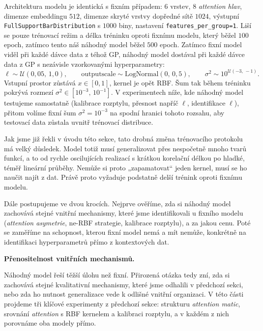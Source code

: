 Architektura modelu je identická s fixním případem: $6$ vrstev, $8$ \emph{attention hlav}, dimenze embeddingu $512$, dimenze skryté vrstvy dopředné sítě $1024$, výstupní \texttt{FullSupportBarDistribution} s $1000$ biny, nastavení \lstinline|features_per_group=1|.
Liší se pouze trénovací režim a délka tréninku oproti fixnímu modelu, který běžel $100$ epoch, zatímco tento náš náhodný model běžel $500$ epoch.
Zatímco fixní model viděl při každé dávce data z téhož GP, náhodný model dostával při každé dávce data z GP s nezávisle vzorkovanými hyperparametry:
$$\ell \sim \mathcal{U}(0{,}05,\, 1{,}0), \qquad \text{outputscale} \sim \text{LogNormal}(0,\, 0{,}5), \qquad \sigma^2 \sim 10^{\mathcal{U}(-3,\,-1)}.$$
Vstupní prostor zůstává $x \in [0, 1]$, kernel je opět RBF.
Šum tak během tréninku pokrývá rozmezí $\sigma^2 \in [10^{-3},\, 10^{-1}]$.
V experimentech níže, kde náhodný model testujeme samostatně (kalibrace rozptylu, přesnost napříč $\ell$, identifikace $\ell$), přitom volíme fixní šum $\sigma^2 = 10^{-3}$ na spodní hranici tohoto rozsahu, aby testovací data zůstala uvnitř trénovací distribuce.
\par

Jak jsme již řekli v úvodu této sekce, tato drobná změna trénovacího protokolu má velký důsledek.
Model totiž musí generalizovat přes nespočetně mnoho tvarů funkcí, a to od rychle oscilujících realizací s krátkou korelační délkou po hladké, téměř lineární průběhy.
Nemůže si proto „zapamatovat“ jeden kernel, musí se ho naučit najít z dat.
Právě proto vyžaduje podstatně delší trénink oproti fixnímu modelu.
\par

Dále postupujeme ve dvou krocích.
Nejprve ověříme, zda si náhodný model zachovává stejné vnitřní mechanismy, které jsme identifikovali u fixního modelu (\emph{attention asymetrie}, ne-RBF strategie, kalibrace rozptylu), a za jakou cenu.
Poté se zaměříme na schopnost, kterou fixní model nemá a mít nemůže, konkrétně na identifikaci hyperparametrů přímo z kontextových dat.

\textbf{Přenositelnost vnitřních mechanismů.}

Náhodný model řeší těžší úlohu než fixní.
Přirozená otázka tedy zní, zda si zachovává stejné kvalitativní mechanismy, které jsme odhalili v předchozí sekci, nebo zda ho nutnost generalizace vede k odlišné vnitřní organizaci.
V této části projdeme tři klíčové experimenty z předchozí sekce: strukturu \emph{attention matic}, srovnání \emph{attention} s RBF kernelem a kalibraci rozptylu, a v každém z nich porovnáme oba modely přímo.

